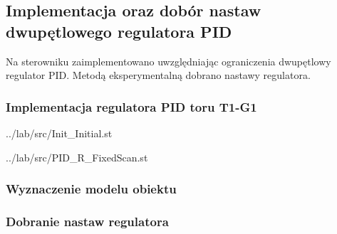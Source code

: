 \subsection{Implementacja oraz dobór nastaw dwupętlowego regulatora PID}
\label{lab:zad3}


\ifdefined\CompileFigures
%    
\fi

Na	sterowniku	zaimplementowano	uwzględniając	ograniczenia	dwupętlowy	
regulator	PID. Metodą	eksperymentalną	 dobrano	nastawy	regulatora.

\subsubsection{Implementacja regulatora PID toru T1-G1}

\ifdefined\CompileListings
    
        {../lab/src/Init_Initial.st}
    \newpage
\fi

\ifdefined\CompileListings
    
        {../lab/src/PID_R_FixedScan.st}
    \newpage
\fi

\subsubsection{Wyznaczenie modelu obiektu}


\subsubsection{Dobranie nastaw regulatora}




\newpage
